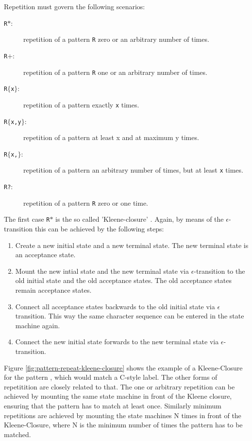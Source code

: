 Repetition must govern the following scenarios:

\begin{description}
\item[{\tt R$*$}:] repetition of a pattern {\tt R} zero or an arbitrary number of times.
\item[{\tt R$+$}:] repetition of a pattern {\tt R} one or an arbitrary number of times.
\item[{\tt R$\{$x$\}$}:] repetition of a pattern exactly  {\tt x} times.
\item[{\tt R$\{$x,y$\}$}:] repetition of a pattern at least x and at maximum y times.
\item[{\tt R$\{$x,$\}$}:] repetition of a pattern an arbitrary number of times, 
     but at least {\tt x} times.
\item[{\tt R?}:] repetition of a pattern {\tt R} zero or one time.
\end{description}

The first case {\tt R$*$} is the so called 'Kleene-closure' \cite{}. Again, by means
of the $\epsilon$-transition this can be achieved by the following steps:

\begin{enumerate}
\item Create a new initial state and a new terminal state. The new terminal state
      is an acceptance state.

\item Mount the new intial state and the new terminal state via $\epsilon$-transition
      to the old initial state and the old acceptance states. The
      old acceptance states remain acceptance states.
      
\item Connect all acceptance states backwards to the old initial state
      via $\epsilon$ transition. This way the same character sequence can 
      be entered in the state machine again.

\item Connect the new initial state forwards to the new terminal state
      via $\epsilon$-transition.
\end{enumerate}

Figure \ref{fig:pattern-repeat-kleene-closure} shows the example of a
Kleene-Closure for the pattern , which would match a C-style
label. The other forms of repetitition are closely related to that. The one or
arbitrary repetition  can be achieved by mounting the same state
machine in front of the Kleene closure, ensuring that the pattern has to match
at least once. Similarly minimum repetitions are achieved by mounting the state
machines N times in front of the Kleene-Closure, where N is the minimum number
of times the pattern has to be matched. 

